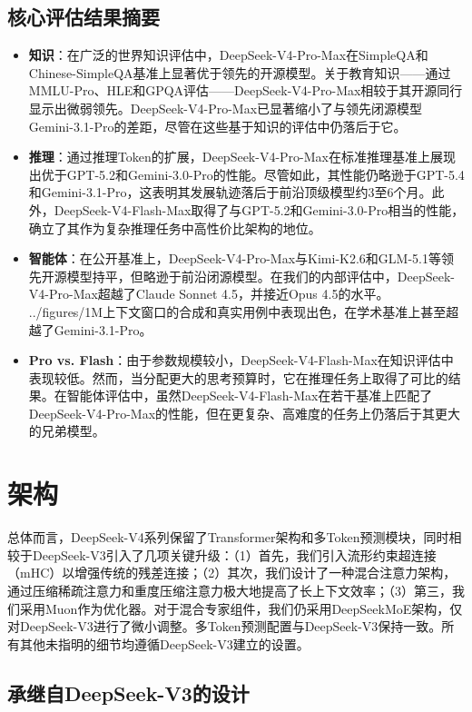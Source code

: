\documentclass[11pt,a4paper]{article}
\newcommand{\dsvfour}{DeepSeek-V4}
\newcommand{\dsvfourpromax}{DeepSeek-V4-Pro-Max}
\newcommand{\dsvfourflashmax}{DeepSeek-V4-Flash-Max}
\newcommand{\dsvthree}{DeepSeek-V3}
\begin{document}
\subsection*{核心评估结果摘要}
\begin{itemize}
    \item \textbf{知识}：在广泛的世界知识评估中，\dsvfourpromax 在SimpleQA和Chinese-SimpleQA基准上显著优于领先的开源模型。关于教育知识——通过MMLU-Pro、HLE和GPQA评估——\dsvfourpromax 相较于其开源同行显示出微弱领先。\dsvfourpromax 已显著缩小了与领先闭源模型Gemini-3.1-Pro的差距，尽管在这些基于知识的评估中仍落后于它。
    \item \textbf{推理}：通过推理Token的扩展，\dsvfourpromax 在标准推理基准上展现出优于GPT-5.2和Gemini-3.0-Pro的性能。尽管如此，其性能仍略逊于GPT-5.4和Gemini-3.1-Pro，这表明其发展轨迹落后于前沿顶级模型约3至6个月。此外，\dsvfourflashmax 取得了与GPT-5.2和Gemini-3.0-Pro相当的性能，确立了其作为复杂推理任务中高性价比架构的地位。
    \item \textbf{智能体}：在公开基准上，\dsvfourpromax 与Kimi-K2.6和GLM-5.1等领先开源模型持平，但略逊于前沿闭源模型。在我们的内部评估中，\dsvfourpromax 超越了Claude Sonnet 4.5，并接近Opus 4.5的水平。
    ../figures/1M上下文窗口的合成和真实用例中表现出色，在学术基准上甚至超越了Gemini-3.1-Pro。
    \item \textbf{Pro vs. Flash}：由于参数规模较小，\dsvfourflashmax 在知识评估中表现较低。然而，当分配更大的思考预算时，它在推理任务上取得了可比的结果。在智能体评估中，虽然\dsvfourflashmax 在若干基准上匹配了\dsvfourpromax 的性能，但在更复杂、高难度的任务上仍落后于其更大的兄弟模型。
\end{itemize}

\section{架构}

总体而言，\dsvfour 系列保留了Transformer架构和多Token预测模块，同时相较于\dsvthree 引入了几项关键升级：（1）首先，我们引入流形约束超连接（mHC）以增强传统的残差连接；（2）其次，我们设计了一种混合注意力架构，通过压缩稀疏注意力和重度压缩注意力极大地提高了长上下文效率；（3）第三，我们采用Muon作为优化器。对于混合专家组件，我们仍采用DeepSeekMoE架构，仅对\dsvthree 进行了微小调整。多Token预测配置与\dsvthree 保持一致。所有其他未指明的细节均遵循\dsvthree 建立的设置。

\subsection{承继自DeepSeek-V3的设计}
\end{document}
